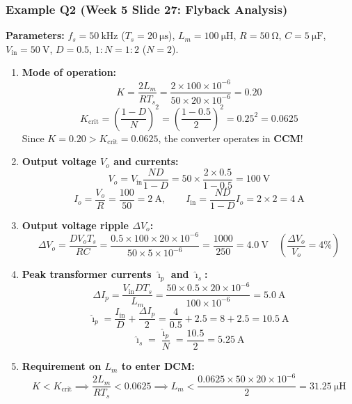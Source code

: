\subsubsection{Example Q2 (Week 5 Slide 27: Flyback Analysis)}
\textbf{Parameters:} $f_s = \SI{50}{\kilo\hertz}$ ($T_s = \SI{20}{\micro\second}$), $L_m = \SI{100}{\micro\henry}$, $R = \SI{50}{\ohm}$, $C = \SI{5}{\micro\farad}$, $V_{\mathrm{in}} = \SI{50}{\volt}$, $D = 0.5$, $1:N = 1:2$ ($N = 2$).
\begin{enumerate}
  \item \textbf{Mode of operation:}
  \[
  K = \frac{2 L_m}{R T_s} = \frac{2 \times 100\times 10^{-6}}{50 \times 20\times 10^{-6}} = 0.20
  \]
  \[
  K_{\mathrm{crit}} = \left(\frac{1-D}{N}\right)^2 = \left(\frac{1-0.5}{2}\right)^2 = 0.25^2 = 0.0625
  \]
  Since $K = 0.20 > K_{\mathrm{crit}} = 0.0625$, the converter operates in \textbf{CCM}!
  \item \textbf{Output voltage $V_o$ and currents:}
  \[
  V_o = V_{\mathrm{in}} \frac{N D}{1-D} = 50 \times \frac{2 \times 0.5}{1-0.5} = \SI{100}{\volt}
  \]
  \[
  I_o = \frac{V_o}{R} = \frac{100}{50} = \SI{2}{\ampere}, \qquad I_{\mathrm{in}} = \frac{N D}{1-D} I_o = 2 \times 2 = \SI{4}{\ampere}
  \]
  \item \textbf{Output voltage ripple $\Delta V_o$:}
  \[
  \Delta V_o = \frac{D V_o T_s}{R C} = \frac{0.5 \times 100 \times 20\times 10^{-6}}{50 \times 5\times 10^{-6}} = \frac{1000}{250} = \SI{4.0}{\volt} \quad \left(\frac{\Delta V_o}{V_o} = 4\%\right)
  \]
  \item \textbf{Peak transformer currents $\hat{\imath}_p$ and $\hat{\imath}_s$:}
  \[
  \Delta I_p = \frac{V_{\mathrm{in}} D T_s}{L_m} = \frac{50 \times 0.5 \times 20\times 10^{-6}}{100\times 10^{-6}} = \SI{5.0}{\ampere}
  \]
  \[
  \hat{\imath}_p = \frac{I_{\mathrm{in}}}{D} + \frac{\Delta I_p}{2} = \frac{4}{0.5} + 2.5 = 8 + 2.5 = \SI{10.5}{\ampere}
  \]
  \[
  \hat{\imath}_s = \frac{\hat{\imath}_p}{N} = \frac{10.5}{2} = \SI{5.25}{\ampere}
  \]
  \item \textbf{Requirement on $L_m$ to enter DCM:}
  \[
  K < K_{\mathrm{crit}} \implies \frac{2 L_m}{R T_s} < 0.0625 \implies L_m < \frac{0.0625 \times 50 \times 20\times 10^{-6}}{2} = \SI{31.25}{\micro\henry}
  \]
\end{enumerate}

